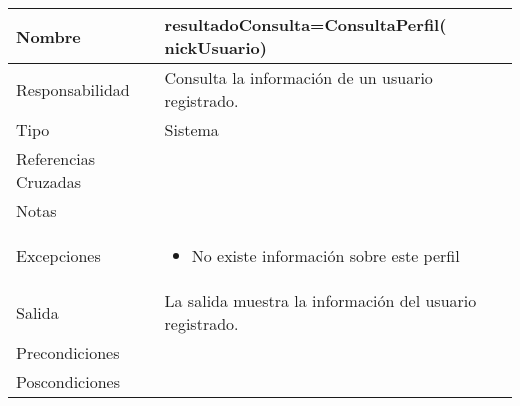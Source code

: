 \documentclass{article}
\begin{document}
\begin{table}[h]
\begin{tabular}{|l|l|l|l|l|l|}
\hline
\multicolumn{2}{|p{3cm}|}{Nombre} & \multicolumn{4}{p{10cm}|}{\textbf{resultadoConsulta=ConsultaPerfil( nickUsuario)}}\\
\hline
\multicolumn{2}{|p{3cm}|}{Responsabilidad} & \multicolumn{4}{p{10cm}|}{Consulta la información de un usuario registrado.} \\
\hline
\multicolumn{2}{|p{3cm}|}{Tipo} & \multicolumn{4}{p{10cm}|}{Sistema} \\
\hline
\multicolumn{2}{|p{3cm}|}{Referencias Cruzadas} & \multicolumn{4}{p{10cm}|}{} \\
\hline
\multicolumn{2}{|p{3cm}|}{Notas} & \multicolumn{4}{p{10cm}|}{} \\
\hline
\multicolumn{2}{|p{3cm}|}{Excepciones} & \multicolumn{4}{p{10cm}|}{\begin{itemize}
\item No existe información sobre este perfil
\end{itemize}} \\
\hline
\multicolumn{2}{|p{3cm}|}{Salida} & \multicolumn{4}{p{10cm}|}{La salida muestra la información del usuario registrado.} \\
\hline
\multicolumn{2}{|p{3cm}|}{Precondiciones} & \multicolumn{4}{p{10cm}|}{} \\
\hline
\multicolumn{2}{|p{3cm}|}{Poscondiciones} & \multicolumn{4}{p{10cm}|}{} \\
\hline
\end{tabular}
\end{table}
\end{document}
